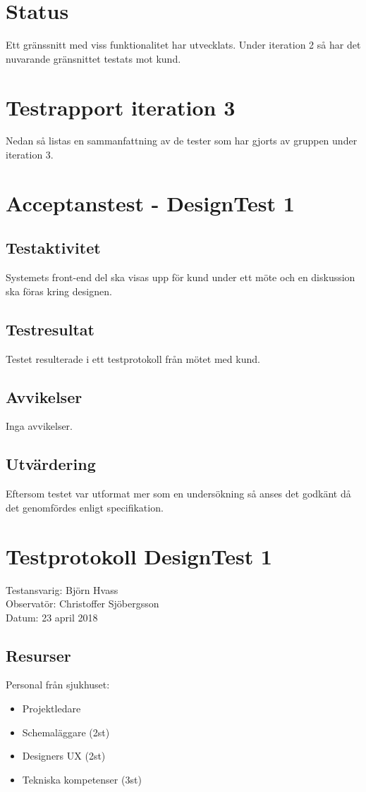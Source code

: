 \documentclass[a4paper,10pt, twoside]{article}
\begin{document}


\newpage
\section{Status}
Ett gränssnitt med viss funktionalitet har utvecklats. Under iteration 2 så har det nuvarande gränsnittet testats 
mot kund.  

\section{Testrapport iteration 3}
Nedan så listas en sammanfattning av de tester som har gjorts av gruppen under iteration 3.  

\section{Acceptanstest - DesignTest 1}
\subsection{Testaktivitet}
Systemets front-end del ska visas upp för kund under ett möte och en diskussion ska föras kring designen.
\subsection{Testresultat}
Testet resulterade i ett testprotokoll från mötet med kund.

\subsection{Avvikelser}
Inga avvikelser.
\subsection{Utvärdering}
Eftersom testet var utformat mer som en undersökning så anses det godkänt då det genomfördes enligt specifikation.

\clearpage
\appendix
\section{Testprotokoll DesignTest 1}
Testansvarig: Björn Hvass\\Observatör: Christoffer Sjöbergsson\\Datum: 23 april 2018

\subsection{Resurser}
Personal från sjukhuset:
\begin{itemize}
	\item Projektledare
    \item Schemaläggare (2st)
	\item Designers UX (2st)
    \item Tekniska kompetenser (3st)
\end{itemize}
\end{document}
